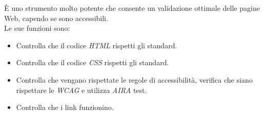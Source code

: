 È uno strumento molto potente che consente un validazione ottimale delle pagine Web, capendo se sono accessibili.\\
Le sue funzioni sono:
\begin{itemize}
	\item Controlla che il codice \emph{HTML} rispetti gli standard.
	\item Controlla che il codice \emph{CSS} rispetti gli standard.
	\item Controlla che vengano rispettate le regole di accessibilità, verifica che siano rispettare le \emph{WCAG} e utilizza \emph{AIRA} test.
	\item Controlla che i link funzionino.
\end{itemize}